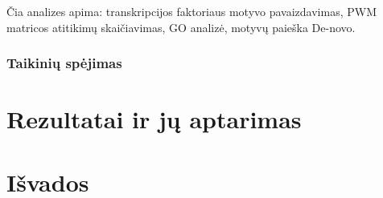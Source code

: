 \documentclass[12pt]{article}
\begin{document}
Čia analizes apima: transkripcijos faktoriaus motyvo pavaizdavimas, PWM
matricos atitikimų skaičiavimas, GO analizė, motyvų paieška De-novo.

\subsubsection*{Taikinių spėjimas}

\newpage


\section{Rezultatai ir jų aptarimas}
\newpage


\section{Išvados}
\newpage

\end{document}

